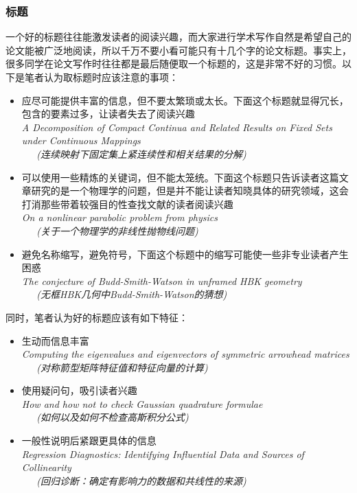 \documentclass{formatBook}
\begin{document}
\subsubsection{标题}
一个好的标题往往能激发读者的阅读兴趣，而大家进行学术写作自然是希望自己的论文能被广泛地阅读，所以千万不要小看可能只有十几个字的论文标题。事实上，很多同学在论文写作时往往都是最后随便取一个标题的，这是非常不好的习惯。以下是笔者认为取标题时应该注意的事项：
\begin{itemize}
    \item 应尽可能提供丰富的信息，但不要太繁琐或太长。下面这个标题就显得冗长，包含的要素过多，让读者失去了阅读兴趣\\
          \textit{A Decomposition of Compact Continua and Related Results on Fixed Sets under Continuous Mappings \\ \ \ \  (连续映射下固定集上紧连续性和相关结果的分解)}
    \item 可以使用一些精炼的关键词，但不能太笼统。下面这个标题只告诉读者这篇文章研究的是一个物理学的问题，但是并不能让读者知晓具体的研究领域，这会打消那些带着较强目的性查找文献的读者阅读兴趣\\
          \textit{On a nonlinear parabolic problem from physics \\ \ \ \  (关于一个物理学的非线性抛物线问题)}
    \item 避免名称缩写，避免符号，下面这个标题中的缩写可能使一些非专业读者产生困惑\\
          \textit{The conjecture of Budd-Smith-Watson in unframed HBK geometry  \\ \ \ \ (无框HBK几何中Budd-Smith-Watson的猜想)}
\end{itemize}
\par
同时，笔者认为好的标题应该有如下特征：
\begin{itemize}
    \item 生动而信息丰富\\
          \textit{Computing the eigenvalues and eigenvectors of symmetric arrowhead matrices \\ \ \ \ (对称箭型矩阵特征值和特征向量的计算)}
    \item 使用疑问句，吸引读者兴趣\\
          \textit{How and how not to check Gaussian quadrature formulae \\ \ \ \ (如何以及如何不检查高斯积分公式)}
    \item 一般性说明后紧跟更具体的信息\\
          \textit{Regression Diagnostics: Identifying Influential Data and Sources of Collinearity \\  \ \ \
              (回归诊断：确定有影响力的数据和共线性的来源)}
\end{itemize}
\end{document}

